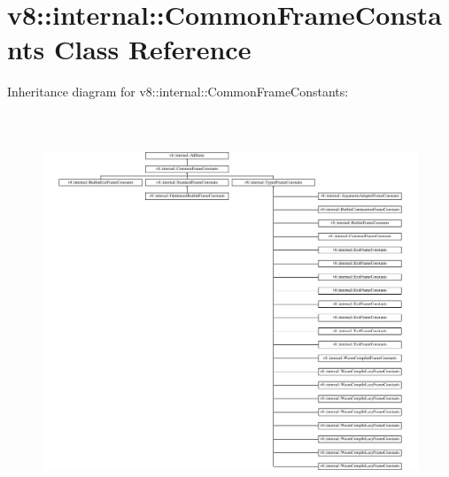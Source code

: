 \hypertarget{classv8_1_1internal_1_1CommonFrameConstants}{}\section{v8\+:\+:internal\+:\+:Common\+Frame\+Constants Class Reference}
\label{classv8_1_1internal_1_1CommonFrameConstants}
Inheritance diagram for v8\+:\+:internal\+:\+:Common\+Frame\+Constants\+:\begin{figure}[H]
\begin{center}
\leavevmode
\includegraphics[height=11.830986cm]{classv8_1_1internal_1_1CommonFrameConstants}
\end{center}
\end{figure}

